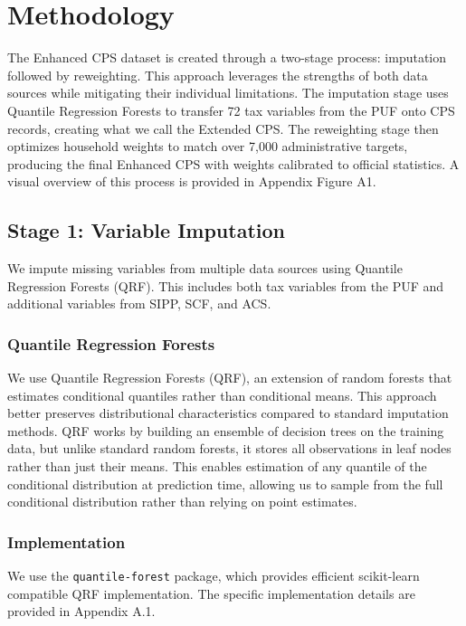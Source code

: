 \section{Methodology}

The Enhanced CPS dataset is created through a two-stage process: imputation followed by reweighting. This approach leverages the strengths of both data sources while mitigating their individual limitations. The imputation stage uses Quantile Regression Forests to transfer 72 tax variables from the PUF onto CPS records, creating what we call the Extended CPS. The reweighting stage then optimizes household weights to match over 7,000 administrative targets, producing the final Enhanced CPS with weights calibrated to official statistics. A visual overview of this process is provided in Appendix Figure A1.

\subsection{Stage 1: Variable Imputation}

We impute missing variables from multiple data sources using Quantile Regression Forests (QRF). This includes both tax variables from the PUF and additional variables from SIPP, SCF, and ACS.

\subsubsection{Quantile Regression Forests}

We use Quantile Regression Forests (QRF), an extension of random forests that estimates conditional quantiles rather than conditional means. This approach better preserves distributional characteristics compared to standard imputation methods. QRF works by building an ensemble of decision trees on the training data, but unlike standard random forests, it stores all observations in leaf nodes rather than just their means. This enables estimation of any quantile of the conditional distribution at prediction time, allowing us to sample from the full conditional distribution rather than relying on point estimates.

\subsubsection{Implementation}

We use the \texttt{quantile-forest} package, which provides efficient scikit-learn compatible QRF implementation. The specific implementation details are provided in Appendix A.1.

